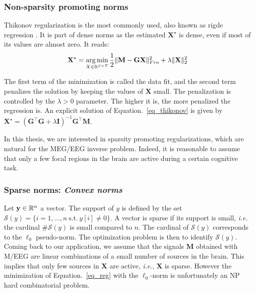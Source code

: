 \subsubsection*{Non-sparsity promoting norms}
Thikonov regularization \cite{tikhonov1977solutions} is the most commonly used, also known as rigde regression \cite{hoerl1970ridge}. It is part of dense norms as the estimated $\mathbf{X}^\star$ is dense, even if most of its values are almost zero. It reads:
\begin{equation} \label{eq_thikonov}
	\mathbf{X}^\star = \mathop{\mathrm{arg}\,\mathrm{min}}_{X\in\mathbb{R}^{S\times T}}\frac{1}{2}\|\mathbf{M}-\mathbf{GX}\|_{Fro}^2 + \lambda\|\mathbf{X}\|_2^2
\end{equation}

The first term of the minimization is called the data fit, and the second term penalizes the solution by keeping the values of $\mathbf{X}$ small. The penalization is controlled by the $\lambda>0$ parameter. The higher it is, the more penalized the regression is. An explicit solution of Equation.~\eqref{eq_thikonov} is given by $\mathbf{X}^\star = (\mathbf{G}^\top\mathbf{G}+\lambda\mathbf{I})^{-1}\mathbf{G}^\top\mathbf{M}$. 

In this thesis, we are interested in sparsity promoting regularizations, which are natural for the MEG/EEG inverse problem. Indeed, it is reasonable to assume that only a few focal regions in the brain are active during a certain cognitive task.

\subsubsection*{Sparse norms: \textit{Convex norms}}
Let $\mathbf{y}\in\mathbb{R}^n$ a vector. The support of $y$ is defined by the set $\mathcal{S}(y) = \{i=1,\dots ,n \mathrm{\ s.t.\ } y[i]\neq 0\}$.
A vector is sparse if its support is small, \textit{i.e.} the cardinal $\# \mathcal{S}(y)$ is small compared to $n$.
The cardinal of $\mathcal{S}(y)$ corresponds to the $\ell_0$ pseudo-norm. The optimization problem is then to identify $\mathcal{S}(y)$.\\

Coming back to our application, we assume that the signals $\mathbf{M}$ obtained with M/EEG are linear combinations of a small number of sources in the brain. This implies that only few sources in $\mathbf{X}$ are active, \textit{i.e.}, $\mathbf{X}$ is sparse. However the minimization of Equation.~\eqref{eq_reg} with the $\ell_0$-norm is unfortunately an NP hard combinatorial problem.


